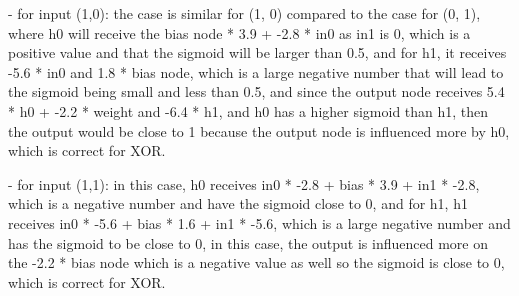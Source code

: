 \documentclass[11pt]{article}
\begin{document}
- for input (1,0): the case is similar for (1, 0) compared to the case for (0, 1), 
where h0 will receive the bias node * 3.9 + -2.8 * in0 as in1 is 0, which is a positive value
and that the sigmoid will be larger than 0.5, and for h1, it receives -5.6 * in0 and 1.8 * bias node, 
which is a large negative number that will lead to the sigmoid being small and less than 0.5, and since
the output node receives 5.4 * h0 + -2.2 * weight and -6.4 * h1, and h0 has a higher sigmoid than h1, 
then the output would be close to 1 because the output node is influenced more by h0, which 
is correct for XOR. 

- for input (1,1): in this case, h0 receives in0 * -2.8 + bias * 3.9 + in1 * -2.8, which is a 
negative number and have the sigmoid close to 0, and for h1, h1 receives in0 * -5.6 + bias * 1.6 + in1 * -5.6, 
which is a large negative number and has the sigmoid to be close to 0, in this case, 
the output is influenced more on the -2.2 * bias node which is a negative value as well so the sigmoid is close to 0, 
which is correct for XOR. 
 
\end{document}
